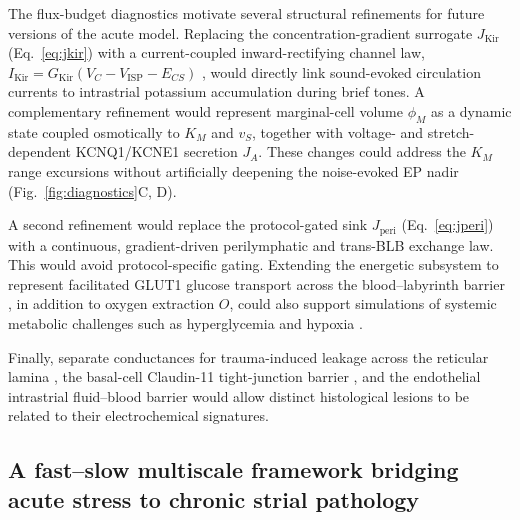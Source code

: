 \documentclass[final,5p,times]{elsarticle}
\begin{document}
The flux-budget diagnostics motivate several structural refinements for future versions of the acute model. Replacing the concentration-gradient surrogate \(J_{\mathrm{Kir}}\) (Eq.~\ref{eq:jkir}) with a current-coupled inward-rectifying channel law, \(I_{\mathrm{Kir}}=G_{\mathrm{Kir}}(V_C-V_{\mathrm{ISP}}-E_{CS})\) \citep{Nin2012}, would directly link sound-evoked circulation currents to intrastrial potassium accumulation during brief tones. A complementary refinement would represent marginal-cell volume \(\phi_M\) as a dynamic state coupled osmotically to \(K_M\) and \(v_S\), together with voltage- and stretch-dependent KCNQ1/KCNE1 secretion \(J_A\). These changes could address the \(K_M\) range excursions without artificially deepening the noise-evoked EP nadir (Fig.~\ref{fig:diagnostics}C, D).

A second refinement would replace the protocol-gated sink \(J_{\mathrm{peri}}\) (Eq.~\ref{eq:jperi}) with a continuous, gradient-driven perilymphatic and trans-BLB exchange law. This would avoid protocol-specific gating. Extending the energetic subsystem to represent facilitated GLUT1 glucose transport across the blood--labyrinth barrier \citep{Ferrary1987}, in addition to oxygen extraction \(O\), could also support simulations of systemic metabolic challenges such as hyperglycemia and hypoxia \citep{Kusakari1978,Shi2024}.

Finally, separate conductances for trauma-induced leakage across the reticular lamina \citep{Ohlemiller2018}, the basal-cell Claudin-11 tight-junction barrier \citep{Nin2008}, and the endothelial intrastrial fluid--blood barrier \citep{Shi2016} would allow distinct histological lesions to be related to their electrochemical signatures.

\subsection{A fast--slow multiscale framework bridging acute stress to chronic strial pathology}\label{sec:future-multiscale}
\end{document}
